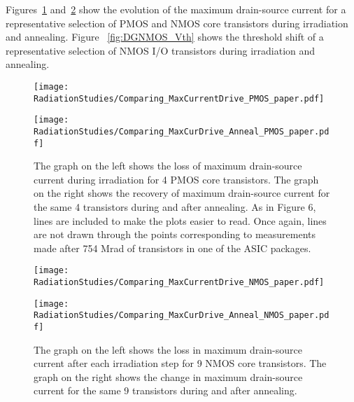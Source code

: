 Figures~\ref{fig:MaxCurDrive_PMOS} and~\ref{fig:MaxCurDrive_NMOS} show the evolution of the maximum drain-source current for a representative selection of PMOS and NMOS core transistors during irradiation and annealing. Figure ~\ref{fig:DGNMOS_Vth} shows the threshold shift of a representative selection of NMOS I/O transistors during irradiation and annealing.

\begin{figure}[htb!]
\begin{minipage}[b]{0.5\textwidth}
	\centering
	\texttt{[image: RadiationStudies/Comparing\_MaxCurrentDrive\_PMOS\_paper.pdf]}
\end{minipage}
\hspace{0.5cm}
\begin{minipage}[b]{0.5\textwidth}
	\centering
	\texttt{[image: RadiationStudies/Comparing\_MaxCurDrive\_Anneal\_PMOS\_paper.pdf]}
\end{minipage}
\caption{The graph on the left shows the loss of maximum drain-source current during irradiation for 4 PMOS core transistors. The graph on the right shows the recovery of maximum drain-source current for the same 4 transistors during and after annealing.
As in Figure 6, lines are included to make the plots easier to read.
Once again, lines are not drawn through the points corresponding to measurements made after 754 Mrad of transistors in one of the ASIC packages.}
\label{fig:MaxCurDrive_PMOS}
\end{figure}

\begin{figure}[htb!]
\begin{minipage}[b]{0.5\textwidth}
	\centering
	\texttt{[image: RadiationStudies/Comparing\_MaxCurrentDrive\_NMOS\_paper.pdf]}
\end{minipage}
\hspace{0.5cm}
\begin{minipage}[b]{0.5\textwidth}
	\centering
	\texttt{[image: RadiationStudies/Comparing\_MaxCurDrive\_Anneal\_NMOS\_paper.pdf]}
\end{minipage}
\caption{The graph on the left shows the loss in maximum drain-source current after each irradiation step for 9 NMOS core transistors. The graph on the right shows the change in maximum drain-source current for the same 9 transistors during and after annealing.}
\label{fig:MaxCurDrive_NMOS}
\end{figure}

